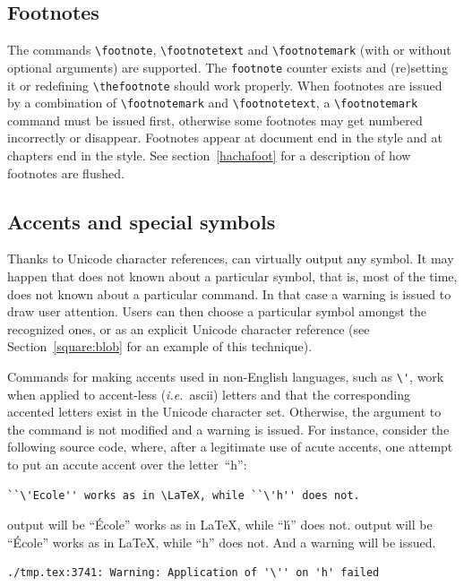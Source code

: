 \subsection{Footnotes}
The commands \verb+\footnote+,
\verb+\footnotetext+ and \verb+\footnotemark+ (with or without
optional arguments) are supported.
The \verb+footnote+ counter exists and (re)setting it or redefining
\verb+\thefootnote+ should work properly.
When footnotes are issued by a combination of \verb+\footnotemark+ and
\verb+\footnotetext+, a \verb+\footnotemark+
command must be issued
first, otherwise some footnotes may get numbered incorrectly or disappear.
Footnotes appear at document end in the  style and
at chapters end in the  style.
See section~\ref{hachafoot} for a description of how footnotes are flushed.


\subsection{Accents\label{accents} and special symbols}
Thanks to Unicode character references, \hevea{} can virtually output
any symbol.
It may happen that \hevea{} does not known about a particular symbol,
that is, most of the time, \hevea{} does not known about a particular
command. In that case a warning is issued to draw user attention.
Users can then choose a particular symbol amongst the recognized ones,
or as an explicit Unicode character reference (see
Section~\ref{square:blob} for an example of this technique).

Commands for making accents used in non-English languages, such as
\verb+\'+, work when applied to accent-less (\emph{i.e.}\ ascii)
letters and that the corresponding accented letters exist
in the Unicode character set.
Otherwise, the argument to the command is not modified
and a warning is issued.
For instance, consider the following source code, where, after a
legitimate use of acute accents, one attempt to put an accute accent
over the letter~``h'':
\begin{verbatim}
``\'Ecole'' works as in \LaTeX, while ``\'h'' does not.
\end{verbatim}
\ifhevea
\hevea{} output will be ``\'Ecole'' works as in \LaTeX, while ``\'h'' does not.
\else
\hevea{} output will  be ``\'Ecole'' works as in \LaTeX, while ``h'' does not.
\fi{}
And a warning will be issued.
\begin{verbatim}
./tmp.tex:3741: Warning: Application of '\'' on 'h' failed
\end{verbatim}


